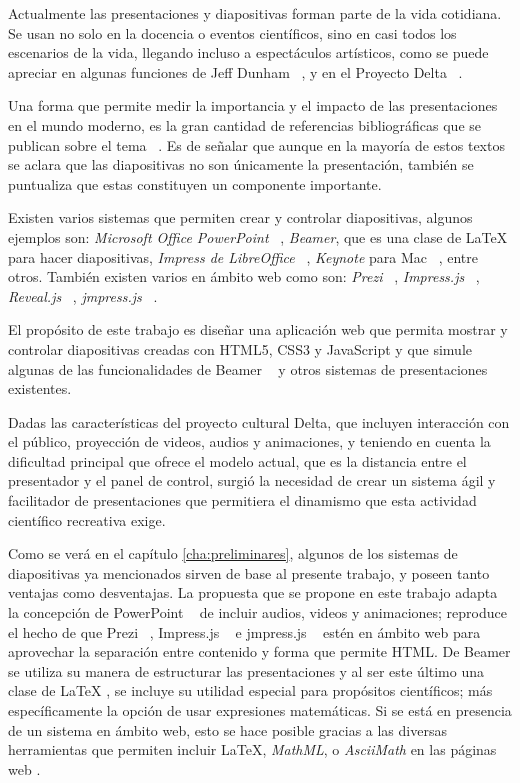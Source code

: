 \begin{introduction}

	Actualmente las presentaciones y diapositivas forman parte de la vida cotidiana. Se usan no solo en la docencia o eventos científicos, sino en casi todos los escenarios de la vida, llegando incluso a espectáculos artísticos, como se puede apreciar en algunas funciones de Jeff Dunham ~\cite{dunham}, y en el Proyecto Delta ~\cite{delta}.


	Una forma que permite medir la importancia y el impacto de las presentaciones en el mundo moderno, es la gran cantidad de referencias bibliográficas que se publican sobre el tema ~\cite{alley, duarte, tufte}. Es de señalar que aunque en la mayoría de estos textos se aclara que las diapositivas no son únicamente la presentación, también se puntualiza que estas constituyen un componente importante.


	Existen varios sistemas que permiten crear y controlar diapositivas, algunos ejemplos son: \textit{Microsoft Office PowerPoint} ~\cite{powerpoint}, \textit{Beamer}, que es una clase de \LaTeX{} para hacer diapositivas, \textit{Impress de LibreOffice} ~\cite{libreoffice}, \textit{Keynote} para Mac ~\cite{keynote}, entre otros. También existen varios en ámbito web como son: \textit{Prezi} ~\cite{prezi}, \textit{Impress.js} ~\cite{impress}, \textit{Reveal.js} ~\cite{reveal}, \textit{jmpress.js} ~\cite{jmpress}.

	El propósito de este trabajo es diseñar una aplicación web que permita mostrar y controlar diapositivas creadas con HTML5, CSS3 y JavaScript y que simule algunas de las funcionalidades de Beamer ~\cite{beamer} y otros sistemas de presentaciones existentes.

	Dadas las características del proyecto cultural Delta, que incluyen interacción con el público, proyección de videos, audios y animaciones, y teniendo en cuenta la dificultad principal que ofrece el modelo actual, que es la distancia entre el presentador y el panel de control, surgió la necesidad de crear un sistema ágil y facilitador de presentaciones que permitiera el dinamismo que esta actividad científico recreativa exige.

	Como se verá en el capítulo \ref{cha:preliminares}, algunos de los sistemas de diapositivas ya mencionados sirven de base al presente trabajo, y poseen tanto ventajas como desventajas. La propuesta que se propone en este trabajo adapta la concepción de PowerPoint ~\cite{powerpoint} de incluir audios, videos y animaciones; reproduce el hecho de que Prezi ~\cite{prezi}, Impress.js ~\cite{impress} e jmpress.js ~\cite{jmpress} estén en ámbito web para aprovechar la separación entre contenido y forma que permite HTML. De Beamer se utiliza su manera de estructurar las presentaciones y al ser este último una clase de \LaTeX{} \cite{latex}, se incluye su utilidad especial para propósitos científicos; más específicamente la opción de usar expresiones matemáticas. Si se está en presencia de un sistema en ámbito web, esto se hace posible gracias a las diversas herramientas que permiten incluir \LaTeX, \textit{MathML}, o \textit{AsciiMath} en las páginas web \cite{mathjax, katex, phpmath}. 



\end{introduction}
